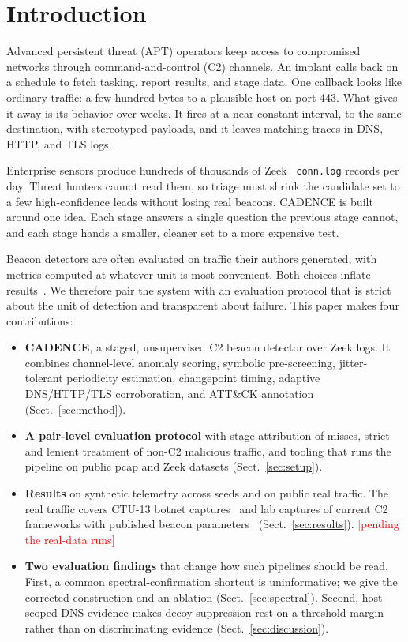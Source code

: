 \documentclass[runningheads]{llncs}
\newcommand{\pending}[1]{\textcolor{red}{[#1]}}
\begin{document}
\section{Introduction}

Advanced persistent threat (APT) operators keep access to compromised networks through command-and-control (C2) channels. An implant calls back on a schedule to fetch tasking, report results, and stage data. One callback looks like ordinary traffic: a few hundred bytes to a plausible host on port 443. What gives it away is its behavior over weeks. It fires at a near-constant interval, to the same destination, with stereotyped payloads, and it leaves matching traces in DNS, HTTP, and TLS logs.

Enterprise sensors produce hundreds of thousands of Zeek~\cite{paxson1999bro} \texttt{conn.log} records per day. Threat hunters cannot read them, so triage must shrink the candidate set to a few high-confidence leads without losing real beacons. CADENCE is built around one idea. Each stage answers a single question the previous stage cannot, and each stage hands a smaller, cleaner set to a more expensive test.

Beacon detectors are often evaluated on traffic their authors generated, with metrics computed at whatever unit is most convenient. Both choices inflate results~\cite{sommer2010closed,arp2022dos}. We therefore pair the system with an evaluation protocol that is strict about the unit of detection and transparent about failure. This paper makes four contributions:
\begin{itemize}
\item \textbf{CADENCE}, a staged, unsupervised C2 beacon detector over Zeek logs. It combines channel-level anomaly scoring, symbolic pre-screening, jitter-tolerant periodicity estimation, changepoint timing, adaptive DNS/HTTP/TLS corroboration, and ATT\&CK annotation (Sect.~\ref{sec:method}).
\item \textbf{A pair-level evaluation protocol} with stage attribution of misses, strict and lenient treatment of non-C2 malicious traffic, and tooling that runs the pipeline on public pcap and Zeek datasets (Sect.~\ref{sec:setup}).
\item \textbf{Results} on synthetic telemetry across \SynSeeds{} seeds and on public real traffic. The real traffic covers CTU-13 botnet captures~\cite{garcia2014ctu13} and lab captures of current C2 frameworks with published beacon parameters~\cite{acm_motd} (Sect.~\ref{sec:results}). \pending{pending the real-data runs}
\item \textbf{Two evaluation findings} that change how such pipelines should be read. First, a common spectral-confirmation shortcut is uninformative; we give the corrected construction and an ablation (Sect.~\ref{sec:spectral}). Second, host-scoped DNS evidence makes decoy suppression rest on a threshold margin rather than on discriminating evidence (Sect.~\ref{sec:discussion}).
\end{itemize}
\end{document}
